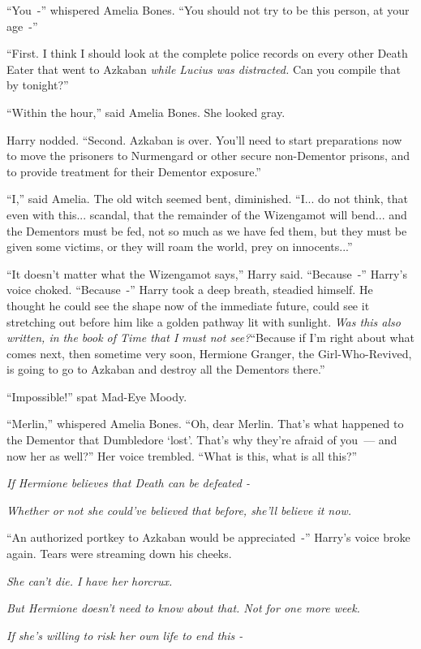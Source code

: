 ``You~-'' whispered Amelia Bones. ``You should not try to be this person, at your age~-''

``First. I think I should look at the complete police records on every other Death Eater that went to Azkaban \emph{while Lucius was distracted.} Can you compile that by tonight?''

``Within the hour,'' said Amelia Bones. She looked gray.

Harry nodded. ``Second. Azkaban is over. You'll need to start preparations now to move the prisoners to Nurmengard or other secure non-Dementor prisons, and to provide treatment for their Dementor exposure.''

``I,'' said Amelia. The old witch seemed bent, diminished. ``I... do not think, that even with this... scandal, that the remainder of the Wizengamot will bend... and the Dementors must be fed, not so much as we have fed them, but they must be given some victims, or they will roam the world, prey on innocents...''

``It doesn't matter what the Wizengamot says,'' Harry said. ``Because~-'' Harry's voice choked. ``Because~-'' Harry took a deep breath, steadied himself. He thought he could see the shape now of the immediate future, could see it stretching out before him like a golden pathway lit with sunlight. \emph{Was this also written, in the book of Time that I must not see?}``Because if I'm right about what comes next, then sometime very soon, Hermione Granger, the Girl-Who-Revived, is going to go to Azkaban and destroy all the Dementors there.''

``Impossible!'' spat Mad-Eye Moody.

``Merlin,'' whispered Amelia Bones. ``Oh, dear Merlin. That's what happened to the Dementor that Dumbledore `lost'. That's why they're afraid of you~--- and now her as well?'' Her voice trembled. ``What is this, what is all this?''

\emph{If Hermione believes that Death can be defeated -}

\emph{Whether or not she could've believed that before, she'll believe it now.}

``An authorized portkey to Azkaban would be appreciated~-'' Harry's voice broke again. Tears were streaming down his cheeks.

\emph{She can't die. I have her horcrux.}

\emph{But Hermione doesn't need to know about that. Not for one more week.}

\emph{If she's willing to risk her own life to end this -}


